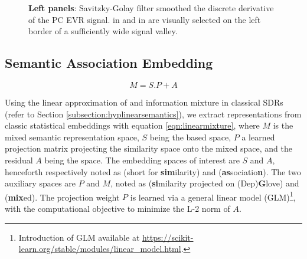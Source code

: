 \begin{figure}
    \centering
    \caption[Smoothed Differentiated EVR of  Embedding PCs]{\textbf{Left panels}: Savitzky-Golay filter smoothed the discrete derivative of the PC EVR signal.  in  and  in  are visually selected on the left border of a sufficiently wide signal valley. }
    \label{fig:SimDimensionSelectionVarRatioDiff}
\end{figure}


\subsection{Semantic Association Embedding}


\begin{equation}
    M = S.P + A 
    \label{eqn:linearmixture}
    \end{equation}

Using the linear approximation of \similarity and \association information mixture in classical SDRs (refer to Section \ref{subsection:hyplinearsemantics}), we extract \association representations from classic statistical embeddings with equation \ref{eqn:linearmixture}, where \(M\) is the mixed semantic representation space, \(S\) being the \similarity based space, \(P\) a learned projection matrix projecting the similarity space onto the mixed space, and the residual \(A\) being the \association space. The embedding spaces of interest are \(S\) and \(A\), henceforth respectively noted as (short for \textbf{sim}ilarity) and  (\textbf{as}sociatio\textbf{n}). The two auxiliary spaces are \(P\) and \(M\), noted as  (\textbf{si}milarity projected on (Dep)\textbf{G}love) and  (\textbf{mix}ed). The projection weight \(P\) is learned via a general linear model (GLM)\footnote{Introduction of GLM available at \url{https://scikit-learn.org/stable/modules/linear_model.html}.}, with the computational objective to minimize the L-2 norm of \(A\).

